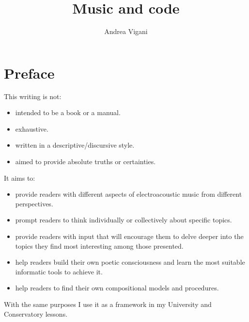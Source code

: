 \documentclass[a4paper,11pt]{book}
\providecommand{\tightlist}{\setlength{\itemsep}{0pt}
                               \setlength{\parskip}{0pt}}
\begin{document}
\author{Andrea Vigani}
\title{Music and code}
\maketitle


\chapter*{Preface}\label{prefazione}

This writing is not: 
\begin{itemize}
\tightlist
\item intended to be a book or a manual.
\item exhaustive.
\item written in a descriptive/discursive style.
\item aimed to provide absolute truths or certainties.
\end{itemize}

It aims to:
\begin{itemize}
\tightlist
\item provide readers with different aspects of electroacoustic music from different perspectives.
\item prompt readers to think individually or collectively about specific topics.
\item provide readers with input that will encourage them to delve deeper into the topics they find most interesting among those presented.
\item help readers build their own poetic consciousness and learn the most suitable informatic tools to achieve it.
\item help readers to find their own compositional models and procedures.
\end{itemize}

With the same purposes I use it as a framework in my University and Conservatory lessons.

\tableofcontents










\lstlistoflistings
\end{document}
